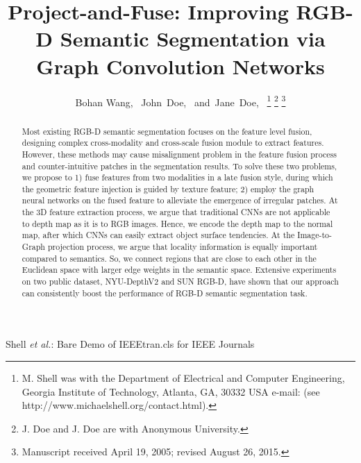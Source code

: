 ﻿\documentclass[journal]{IEEEtran}
\begin{document}


\title{Project-and-Fuse: Improving RGB-D Semantic Segmentation via Graph Convolution Networks}

\author{Bohan Wang,~
        John~Doe,~
        and~Jane~Doe,~%
\thanks{M. Shell was with the Department
of Electrical and Computer Engineering, Georgia Institute of Technology, Atlanta,
GA, 30332 USA e-mail: (see http://www.michaelshell.org/contact.html).}%
\thanks{J. Doe and J. Doe are with Anonymous University.}%
\thanks{Manuscript received April 19, 2005; revised August 26, 2015.}}

%
{Shell \MakeLowercase{\textit{et al.}}: Bare Demo of IEEEtran.cls for IEEE Journals}

\maketitle

\begin{abstract}
    Most existing RGB-D semantic segmentation focuses on the feature level fusion, designing complex cross-modality and cross-scale fusion module to extract features. However, these methods may cause misalignment problem in the feature fusion process and counter-intuitive patches in the segmentation results. To solve these two problems, we propose to 1) fuse features from two modalities in a late fusion style, during which the geometric feature injection is guided by texture feature; 2) employ the graph neural networks on the fused feature to alleviate the emergence of irregular patches. At the 3D feature extraction process, we argue that traditional CNNs are not applicable to depth map as it is to RGB images. Hence, we encode the depth map to the normal map, after which CNNs can easily extract object surface tendencies. At the Image-to-Graph projection process, we argue that locality information is equally important compared to semantics. So, we connect regions that are close to each other in the Euclidean space with larger edge weights in the semantic space. Extensive experiments on two public dataset, NYU-DepthV2 and SUN RGB-D, have shown that our approach can consistently boost the performance of RGB-D semantic segmentation task.
    \end{abstract}
\end{document}
